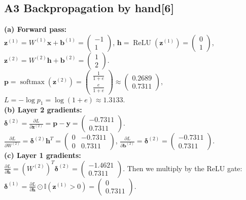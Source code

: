 \documentclass[conference,a4paper]{IEEEtran}
\newcommand{\task}[2]{\subsection{#1\hfill[#2]}}
\begin{document}
\task{A3 Backpropagation by hand}{6}
\textbf{(a) Forward pass:}\\
$\mathbf{z}^{(1)} = W^{(1)}\mathbf{x} + \mathbf{b}^{(1)} = \begin{pmatrix}-1\\1\end{pmatrix}$,
$\mathbf{h} = \operatorname{ReLU}(\mathbf{z}^{(1)}) = \begin{pmatrix}0\\1\end{pmatrix}$,
$\mathbf{z}^{(2)} = W^{(2)}\mathbf{h} + \mathbf{b}^{(2)} = \begin{pmatrix}1\\2\end{pmatrix}$.\\
$\mathbf{p} = \operatorname{softmax}(\mathbf{z}^{(2)}) = \begin{pmatrix}\frac{1}{1+e}\\\frac{e}{1+e}\end{pmatrix} \approx \begin{pmatrix}0.2689\\0.7311\end{pmatrix}$,
$L = -\log p_1 = \log(1+e) \approx \mathbf{1.3133}$.\\[2pt]
\textbf{(b) Layer 2 gradients:}\\
$\boldsymbol\delta^{(2)} = \frac{\partial L}{\partial \mathbf{z}^{(2)}} = \mathbf{p} - \mathbf{y} = \begin{pmatrix}-0.7311\\0.7311\end{pmatrix}$.\\
$\frac{\partial L}{\partial W^{(2)}} = \boldsymbol\delta^{(2)}\mathbf{h}^T = \begin{pmatrix}0 & -0.7311\\0 & 0.7311\end{pmatrix}$, \quad
$\frac{\partial L}{\partial \mathbf{b}^{(2)}} = \boldsymbol\delta^{(2)} = \begin{pmatrix}-0.7311\\0.7311\end{pmatrix}$.\\[2pt]
\textbf{(c) Layer 1 gradients:}\\
$\frac{\partial L}{\partial \mathbf{h}} = (W^{(2)})^T \boldsymbol\delta^{(2)} = \begin{pmatrix}-1.4621\\0.7311\end{pmatrix}$.
Then we multiply by the ReLU gate: $\boldsymbol\delta^{(1)} = \frac{\partial L}{\partial \mathbf{h}} \odot \mathbb{I}(\mathbf{z}^{(1)}>0) = \begin{pmatrix}0\\0.7311\end{pmatrix}$.\\
\end{document}
